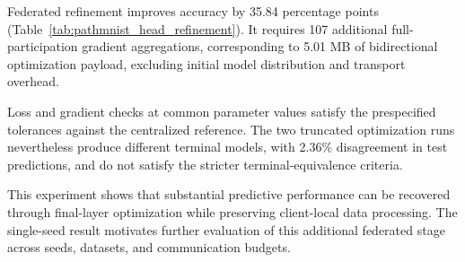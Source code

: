Federated refinement improves accuracy by 35.84 percentage points
(Table~\ref{tab:pathmnist_head_refinement}). It requires 107 additional
full-participation gradient aggregations, corresponding to 5.01 MB of
bidirectional optimization payload, excluding initial model distribution
and transport overhead.

Loss and gradient checks at common parameter values satisfy the prespecified
tolerances against the centralized reference. The two truncated optimization
runs nevertheless produce different terminal models, with 2.36\% disagreement
in test predictions, and do not satisfy the stricter terminal-equivalence
criteria.

This experiment shows that substantial predictive performance can be recovered
through final-layer optimization while preserving client-local data processing.
The single-seed result motivates further evaluation of this additional
federated stage across seeds, datasets, and communication budgets.
